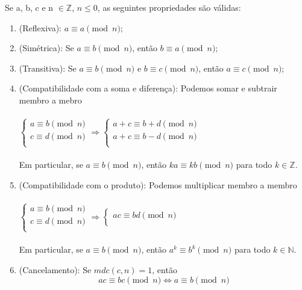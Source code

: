 \begin{prop}
	Se a, b, c e n $\in \mathbb{Z}$, $n \leq 0$, as seguintes propriedades são válidas:
	\begin{enumerate}
		\item (Reflexiva): $a \equiv a \pmod{n}$;
		\item (Simétrica): Se $a \equiv b \pmod{n}$, então $b \equiv a \pmod{n}$;
		\item (Transitiva): Se $a \equiv b \pmod{n}$ e $b \equiv c \pmod{n}$, então $a \equiv c \pmod{n}$;
		\item (Compatibilidade com a soma e diferença): Podemos somar e subtrair membro a mebro \\
		\\
			$ \left\{
			\begin{array}{l}
			a \equiv b \pmod{n} \\
			c \equiv d \pmod{n} \\
			\end{array} \right. \Longrightarrow 
			  \left\{
			 \begin{array}{l}
			 a + c \equiv b + d \pmod{n} \\
			 a + c \equiv b - d \pmod{n} \\
			 \end{array}
			  \right. $ \\ 
			  \\ Em particular, se $a \equiv b \pmod{n}$, então $ka \equiv kb \pmod{n}$ para todo $k \in \mathbb{Z}$.
		\item (Compatibilidade com o produto): Podemos multiplicar membro a membro \\
		\\
			$ \left\{
			\begin{array}{l}
			a \equiv b \pmod{n} \\
			c \equiv d \pmod{n} \\
			\end{array} \right. 
			\Longrightarrow 
			\left\{
			\begin{array}{l}
			ac \equiv bd \pmod{n} \\
			\end{array}
			\right. 
			$ \\
			\\ Em particular, se $a \equiv b \pmod{n}$, então $a^k \equiv b^k \pmod{n}$ para todo $k \in \mathbb{N}$.
		\item (Cancelamento): Se $mdc(c,n) = 1$, então 
			\begin{equation*}
				ac \equiv bc \pmod{n} \Longleftrightarrow a \equiv b \pmod{n}
			\end{equation*}
	\end{enumerate}
\end{prop}

